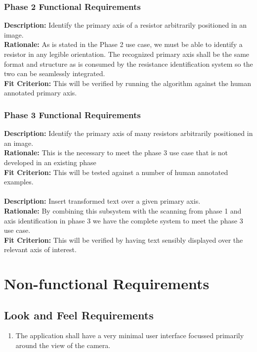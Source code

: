 \documentclass{article}
\begin{document}
\subsubsection{Phase 2 Functional Requirements}

\textbf{Description:} Identify the primary axis of a resistor arbitrarily positioned in an image. 
\\ \textbf{Rationale:} As is stated in the Phase 2 use case, we must be able to identify a resistor in any legible orientation.
The recognized primary axis shall be the same format and structure as is consumed by the resistance identification system so the two can be seamlessly integrated.
\\ \textbf{Fit Criterion: } This will be verified by running the algorithm against the human annotated primary axis.

\subsubsection{Phase 3 Functional Requirements}

\textbf{Description: } Identify the primary axis of many resistors arbitrarily positioned in an image. 
\\ \textbf{Rationale: } This is the necessary to meet the phase 3 use case that is not developed in an existing phase 
\\ \textbf{Fit Criterion: } This will be tested against a number of human annotated examples.
\\ \\
\textbf{Description: } Insert transformed text over a given primary axis.
\\ \textbf{Rationale: } By combining this subsystem with the scanning from phase 1 and axis identification in phase 3 we have the complete system to meet the phase 3 use case.
\\ \textbf{Fit Criterion: } This will be verified by having text sensibly displayed over the relevant axis of interest.


\section{Non-functional Requirements}

\subsection{Look and Feel Requirements }
\begin{enumerate}
\item The application shall have a very minimal user interface focussed primarily around the view of the camera.
\end{enumerate}
\end{document}
